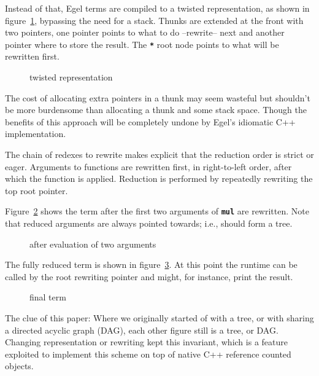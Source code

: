 \documentclass{research4cacm}
\newcommand{\code}[1]{{\bf\texttt{#1}}}
\begin{document}
Instead of that, Egel terms are compiled to a twisted representation,
as shown in figure~\ref{figure:termC}, bypassing the need
for a stack. Thunks are extended at the front with two pointers,
one pointer points to what to do --rewrite-- next and another pointer
where to store the result.
The \code{*} root node points to what will be rewritten first.

\begin{figure}[h]
\begin{center}
\caption{twisted representation}
\label{figure:termC}
\end{center}
\end{figure}

The cost of allocating extra pointers in a thunk may seem wasteful
but shouldn't be more burdensome than allocating a thunk and some
stack space. Though the benefits of this approach will be completely
undone by Egel's idiomatic C++ implementation.

The chain of redexes to rewrite makes explicit that the reduction
order is strict or eager. Arguments to functions are rewritten first,
in right-to-left order, after which the function is applied.
Reduction is performed by repeatedly rewriting the top root pointer.

Figure~\ref{figure:termD} shows the term after the first two
arguments of \code{mul} are rewritten. Note that reduced
arguments are always pointed towards; i.e., should form a tree.

\begin{figure}[h]
\begin{center}
\caption{after evaluation of two arguments}
\label{figure:termD}
\end{center}
\end{figure}

The fully reduced term is shown in figure~\ref{figure:termE}. At
this point the runtime can be called by the root rewriting pointer
and might, for instance, print the result.

\begin{figure}[h]
\begin{center}
\caption{final term}
\label{figure:termE}
\end{center}
\end{figure}

The clue of this paper: Where we originally started of with a tree,
or with sharing a directed acyclic graph (DAG), each other figure 
still is a tree, or DAG. Changing representation or rewriting kept
this invariant, which is a feature exploited to implement this
scheme on top of native C++ reference counted objects.
\end{document}
